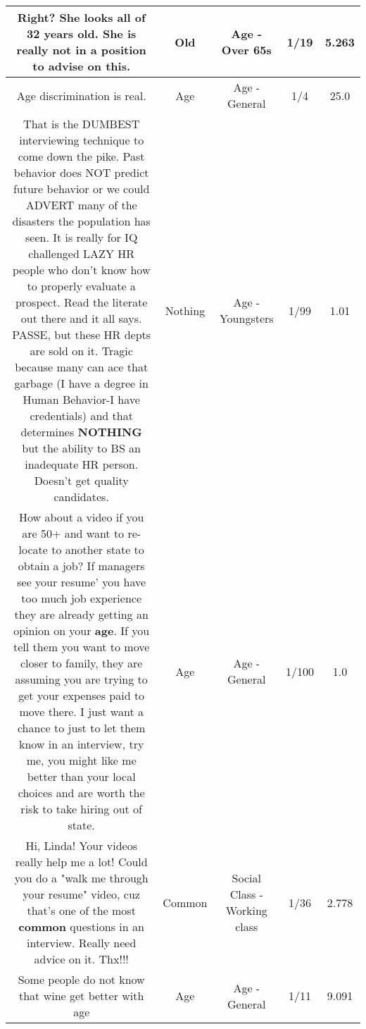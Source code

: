 \documentclass[11pt]{article}
\newlength\mylength
\begin{document}
\begin{center}
\begin{longtable}{|C{.65\mylength}|C{.30\mylength}|C{.12\mylength}|C{.12\mylength}|C{.12\mylength}|}
  \small Right?  She looks all of 32 years \textbf{old}.  She is really not in a position to advise on this.\normalsize   & Old & Age - Over 65s & 1/19 & 5.263 \\  \hline
  \small Age discrimination is real.\normalsize   & Age & Age - General & 1/4 & 25.0 \\  \hline
  \small That is the DUMBEST interviewing technique to come down the pike. Past behavior does NOT predict future behavior or we could ADVERT many of the disasters the population has seen. It is really for IQ challenged LAZY HR people who don't know how to properly evaluate a prospect. Read the literate out there and it all says. PASSE, but these HR depts are sold on it. Tragic because many can ace that garbage (I have a degree in Human Behavior-I have credentials) and that determines \textbf{NOTHING} but the ability to BS an inadequate HR person. Doesn't get quality candidates.\normalsize   & Nothing & Age - Youngsters & 1/99 & 1.01 \\  \hline
  \small How about a video if you are 50+ and want to re-locate to another state to obtain a job?  If managers see your resume' you have too much job experience they are already getting an opinion on your \textbf{age}.  If you tell them you want to move closer to family, they are assuming you are trying to get your expenses paid to move there.  I just want a chance to just to let them know in an interview, try me, you might like me better than your local choices and are worth the risk to take hiring out of state.\normalsize   & Age & Age - General & 1/100 & 1.0 \\  \hline
  \small Hi, Linda! Your videos really help me a lot! Could you do a "walk me through your resume" video, cuz that's one of the most \textbf{common} questions in an interview. Really need advice on it. Thx!!!\normalsize   & Common & Social Class - Working class & 1/36 & 2.778 \\  \hline
  \small Some people do not know that wine get better with age\normalsize   & Age & Age - General & 1/11 & 9.091 \\  \hline

\end{longtable}
\end{center}
\end{document}
